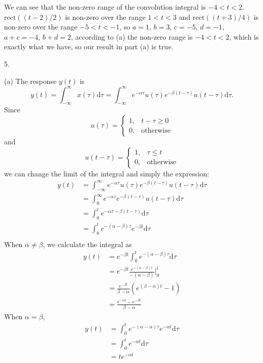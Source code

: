 \documentclass[a4paper]{article}
\begin{document}
We can see that the non-zero range of the convolution integral is $-4<t<2$. $\text{rect}((t-2)/2)$ is non-zero over the range $1<t<3$ and $\text{rect}((t+3)/4)$ is non-zero over the range $-5<t<-1$, so $a=1$, $b=3$, $c=-5$, $d=-1$, $a+c=-4$, $b+d=2$, according to (a) the non-zero range is $-4<t<2$, which is exactly what we have, so our result in part (a) is true.

5.

(a) The response $y(t)$ is
$$y(t)=\int_{-\infty}^\infty x(\tau)\mathrm{d}\tau=\int_{-\infty}^\infty e^{-\alpha\tau}u(\tau)e^{-\beta(t-\tau)}u(t-\tau)\mathrm{d}\tau.$$
Since
\[u(\tau)=
    \begin{cases}
        1,&t-\tau\geq0\\
        0,&\text{otherwise}
    \end{cases}
\]
and
\[u(t-\tau)=
    \begin{cases}
        1,&\tau\leq t\\
        0,&\text{otherwise}
    \end{cases}
\]
we can change the limit of the integral and simply the expression:
\begin{align*}
    y(t)&=\int_{-\infty}^\infty e^{-\alpha\tau}u(\tau)e^{-\beta(t-\tau)}u(t-\tau)\mathrm{d}\tau\\
    &=\int_0^\infty e^{-\alpha\tau}e^{-\beta(t-\tau)}u(t-\tau)\mathrm{d}\tau\\
    &=\int_0^t e^{-\alpha\tau-\beta(t-\tau)}\mathrm{d}\tau\\
    &=\int_0^t e^{-(\alpha-\beta)\tau}e^{-\beta t}\mathrm{d}\tau\\
\end{align*}
When $\alpha\neq\beta$, we calculate the integral as
\begin{align*}
    y(t)&=e^{-\beta t}\int_0^te^{-(\alpha-\beta)\tau}\mathrm{d}\tau\\
    &=e^{-\beta t}\frac{e^{-(\alpha-\beta)\tau}}{-(\alpha-\beta)}\bigg|_0^t\\
    &=\frac{e^{-\beta t}}{\beta-\alpha}(e^{(\beta-\alpha)t}-1)\\
    &=\frac{e^{-\alpha t}-e^{-\beta t}}{\beta-\alpha}
\end{align*}
When $\alpha=\beta$,
\begin{align*}
    y(t)&=\int_0^t e^{-(\alpha-\alpha)\tau}e^{-\alpha t}\mathrm{d}\tau\\
    &=\int_0^t e^{-\alpha t}\mathrm{d}\tau\\
    &=te^{-\alpha t}
\end{align*}
\end{document}
